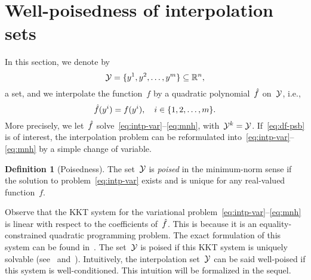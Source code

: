 \documentclass[draft]{article}
\numberwithin{equation}{section}
\theoremstyle{definition}
\newtheorem{definition}{Definition}[section]
\theoremstyle{plain}
\theoremstyle{remark}
\newcommand*{\obj}{f}
\newcommand*{\objm}[1][]{\hat{\obj}\ifblank{#1}{}{^{#1}}}
\newcommand*{\R}{\mathbb{R}}
\newcommand*{\set}[2][]{#1\{#2#1\}}
\newcommand*{\xpt}[1][]{\mathcal{Y}\ifblank{#1}{}{^{#1}}}
\begin{document}
\section{Well-poisedness of interpolation sets}
\label{sec:well-poisedness}

In this section, we denote by
\begin{equation*}
    \xpt = \set{y^1, y^2, \dots, y^m} \subseteq \R^n,
\end{equation*}
a set, and we interpolate the function~$\obj$ by a quadratic polynomial~$\objm$ on~$\xpt$, i.e.,
\begin{equation}
    \label{eq:intp-cond-gen}
    \objm(y^i) = \obj(y^i), \quad i \in \set{1, 2, \dots, m}.
\end{equation}
More precisely, we let~$\objm$ solve~\eqref{eq:intp-var}--\eqref{eq:mnh}, with~$\xpt[k] = \xpt$.
If~\eqref{eq:df-psb} is of interest, the interpolation problem can be reformulated into~\eqref{eq:intp-var}--\eqref{eq:mnh} by a simple change of variable.


\begin{definition}[Poisedness]
    The set~$\xpt$ is \emph{poised} in the minimum-norm sense if the solution to problem~\eqref{eq:intp-var} exists and is unique for any real-valued function~$\obj$.
\end{definition}

Observe that the KKT system for the variational problem~\eqref{eq:intp-var}--\eqref{eq:mnh} is linear with respect to the coefficients of~$\objm$.
This is because it is an equality-constrained quadratic programming problem.
The exact formulation of this system can be found in~\cite{Powell_2004b,Powell_2006}.
The set~$\xpt$ is poised if this KKT system is uniquely solvable (see~\cite[\S~2]{Powell_2004a} and~\cite[\S~5.3]{Conn_Scheinberg_Vicente_2009}).
Intuitively, the interpolation set~$\xpt$ can be said well-poised if this system is well-conditioned.
This intuition will be formalized in the sequel.
\end{document}
